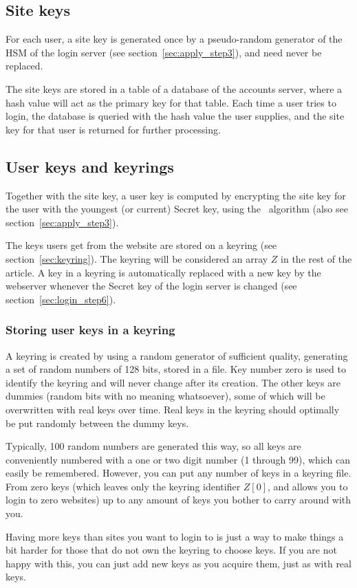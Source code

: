 \subsection{Site keys}
For each user,
a site key is generated once by a pseudo-random generator of the HSM of the login server
(see section~\vref{sec:apply_step3}),
and need never be replaced.
\par
The site keys are stored in a table of a database of the accounts server,
where a hash value will act as the primary key for that table.
Each time a user tries to login,
the database is queried with the hash value the user supplies,
and the site key for that user is returned for further processing.

\subsection{User keys and keyrings}
\label{sec:userkeys}
Together with the site key,
a user key is computed by encrypting the site key for the user with the youngest
(or current)
Secret key,
using the \AES\ algorithm
(also see section~\vref{sec:apply_step3}).
\par
The keys users get from the website are stored on a keyring (see section~\vref{sec:keyring}).
The keyring will be considered an array $Z$ in the rest of the article.
A key in a keyring is automatically replaced with a new key by the webserver
whenever the Secret key of the login server is changed
(see section~\vref{sec:login_step6}).

\subsubsection{Storing user keys in a keyring}
\label{sec:keyring}
A keyring is created by using a random generator of sufficient quality,
generating a set of random numbers of 128 bits,
stored in a file.
Key number zero is used to identify the keyring and will never change after its creation.
The other keys are dummies
(random bits with no meaning whatsoever),
some of which will be overwritten with real keys over time.
Real keys in the keyring should optimally be put randomly between the dummy keys.
\par
Typically,
100 random numbers are generated this way,
so all keys are conveniently numbered with a one or two digit number
(1 through 99),
which can easily be remembered.
However,
you can put any number of keys in a keyring file.
From zero keys
(which leaves only the keyring identifier $Z[0]$,
and allows you to login to zero websites)
up to any amount of keys you bother to carry around with you.
\par
Having more keys than sites you want to login to is just a way to make things
a bit harder for those that do not own the keyring to choose keys.
If you are not happy with this,
you can just add new keys as you acquire them,
just as with real keys.

